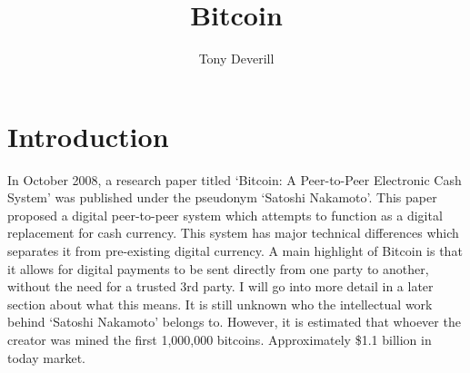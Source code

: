 \documentclass[10pt, a4paper]{report}
\title{Bitcoin}
\author{Tony Deverill}
\begin{document}
\maketitle

\section*{Introduction}
In October 2008, a research paper titled `Bitcoin: A Peer-to-Peer Electronic Cash System'
was published under the pseudonym `Satoshi Nakamoto'. This paper proposed a digital
peer-to-peer system which attempts to function as a digital replacement for cash currency.
This system has major technical differences which separates it from pre-existing
digital currency. A main highlight of Bitcoin is that it allows for digital payments to be sent directly from
one party to another, without the need for a trusted 3rd party.
I will go into more detail in a later section about what this means.
It is still unknown who the intellectual work behind `Satoshi Nakamoto' belongs to.
However, it is estimated that whoever the creator was mined the first 1,000,000 bitcoins.
Approximately \$1.1 billion in today market.
\end{document}

